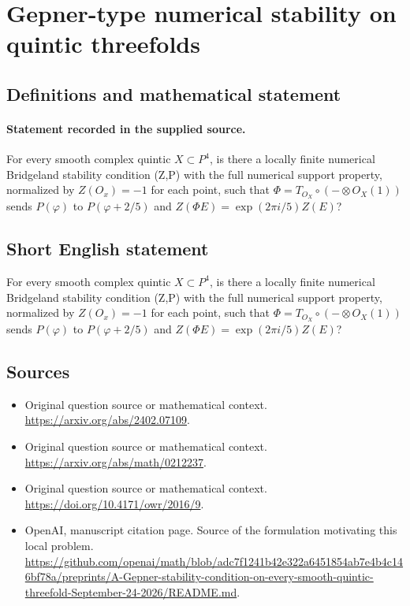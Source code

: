 \documentclass[11pt]{article}
\begin{document}
\section*{Gepner-type numerical stability on quintic threefolds}\label{30007031}
\subsection{Definitions and mathematical statement}
\paragraph{Statement recorded in the supplied source.}
For every smooth complex quintic $X\subset P^{4}$, is there a locally finite numerical Bridgeland stability condition (Z,P) with the full numerical support property, normalized by $Z(O_x)=-1$ for each point, such that $\Phi =T_{O_X}\circ (-\otimes O_X(1))$ sends $P(\varphi )$ to $P(\varphi +2/5)$ and $Z(\Phi E)=\exp (2\pi i/5)Z(E)$?
\subsection{Short English statement}
For every smooth complex quintic $X\subset P^{4}$, is there a locally finite numerical Bridgeland stability condition (Z,P) with the full numerical support property, normalized by $Z(O_x)=-1$ for each point, such that $\Phi =T_{O_X}\circ (-\otimes O_X(1))$ sends $P(\varphi )$ to $P(\varphi +2/5)$ and $Z(\Phi E)=\exp (2\pi i/5)Z(E)$?
\subsection{Sources}
\begin{itemize}
\item[S1] Original question source or mathematical context.
\url{https://arxiv.org/abs/2402.07109}.
\item[S2] Original question source or mathematical context.
\url{https://arxiv.org/abs/math/0212237}.
\item[S3] Original question source or mathematical context.
\url{https://doi.org/10.4171/owr/2016/9}.
\item[S4] OpenAI, manuscript citation page. Source of the formulation motivating this local problem.
\url{https://github.com/openai/math/blob/adc7f1241b42e322a6451854ab7e4b4c146bf78a/preprints/A-Gepner-stability-condition-on-every-smooth-quintic-threefold-September-24-2026/README.md}.
\end{itemize}
\end{document}
